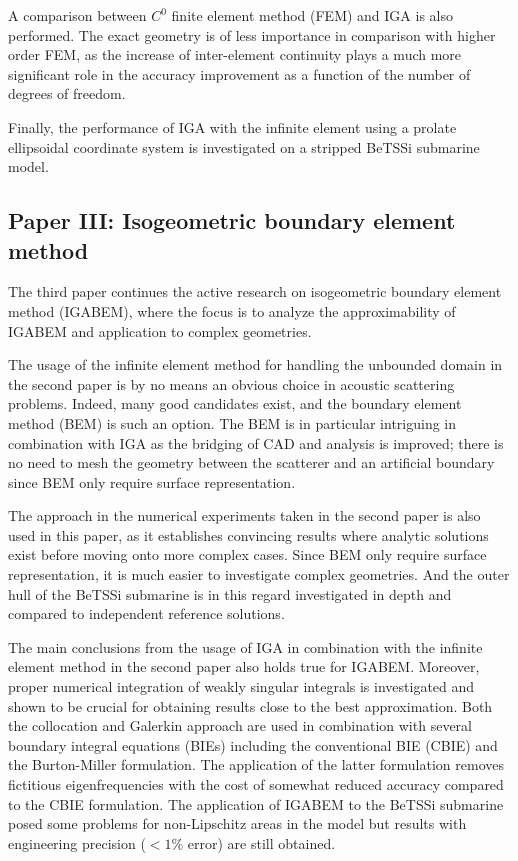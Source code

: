 A comparison between $C^0$ finite element method (FEM) and IGA is also performed. The exact geometry is of less importance in comparison with higher order FEM, as the increase of inter-element continuity plays a much more significant role in the accuracy improvement as a function of the number of degrees of freedom. 

Finally, the performance of IGA with the infinite element using a prolate ellipsoidal coordinate system is investigated on a stripped BeTSSi submarine model.

\subsection{Paper III: Isogeometric boundary element method}
The third paper continues the active research on isogeometric boundary element method (IGABEM), where the focus is to analyze the approximability of IGABEM and application to complex geometries. 

The usage of the infinite element method for handling the unbounded domain in the second paper is by no means an obvious choice in acoustic scattering problems. Indeed, many good candidates exist, and the boundary element method (BEM) is such an option. The BEM is in particular intriguing in combination with IGA as the bridging of CAD and analysis is improved; there is no need to mesh the geometry between the scatterer and an artificial boundary since BEM only require surface representation. 

The approach in the numerical experiments taken in the second paper is also used in this paper, as it establishes convincing results where analytic solutions exist before moving onto more complex cases. Since BEM only require surface representation, it is much easier to investigate complex geometries. And the outer hull of the BeTSSi submarine is in this regard investigated in depth and compared to independent reference solutions. 

The main conclusions from the usage of IGA in combination with the infinite element method in the second paper also holds true for IGABEM. Moreover, proper numerical integration of weakly singular integrals is investigated and shown to be crucial for obtaining results close to the best approximation. Both the collocation and Galerkin approach are used in combination with several boundary integral equations (BIEs) including the conventional BIE (CBIE) and the Burton-Miller formulation. The application of the latter formulation removes fictitious eigenfrequencies with the cost of somewhat reduced accuracy compared to the CBIE formulation. The application of IGABEM to the BeTSSi submarine posed some problems for non-Lipschitz areas in the model but results with engineering precision ($<1\%$ error) are still obtained.

